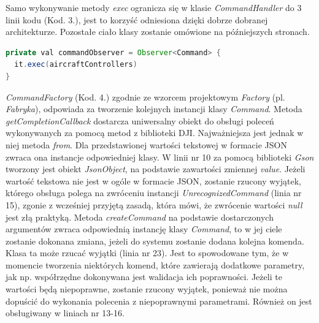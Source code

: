 Samo wykonywanie metody \textit{exec} ogranicza się w klasie \textit{CommandHandler} do 3 linii kodu (Kod. 3.), jest to korzyść odniesiona dzięki dobrze dobranej architekturze. Pozostałe ciało klasy zostanie omówione na późniejszych stronach.

\newpage

\begin{lstlisting}[language=Java, caption=Fragment kodu z CommandHandler]
private val commandObserver = Observer<Command> {
  it.exec(aircraftControllers)
}
\end{lstlisting}

\textit{CommandFactory} (Kod. 4.) zgodnie ze wzorcem projektowym \textit{Factory} (pl. \textit{Fabryka}), odpowiada za tworzenie kolejnych instancji klasy \textit{Command}. Metoda \textit{getCompletionCallback} dostarcza uniwersalny obiekt do obsługi poleceń wykonywanych za pomocą metod z biblioteki DJI. Najważniejsza jest jednak w niej metoda \textit{from}. Dla przedstawionej wartości tekstowej w formacie JSON zwraca ona instancje odpowiedniej klasy. W linii nr 10 za pomocą biblioteki \textit{Gson} tworzony jest obiekt \textit{JsonObject}, na podstawie zawartości zmiennej \textit{value}. Jeżeli wartość tekstowa nie jest w ogóle w formacie JSON, zostanie rzucony wyjątek, którego obsługa polega na zwróceniu instancji \textit{UnrecognizedCommand} (linia nr 15), zgonie z wcześniej przyjętą zasadą, która mówi, że zwrócenie wartości \textit{null} jest złą praktyką. Metoda \textit{createCommand} na podstawie dostarczonych argumentów zwraca odpowiednią instancję klasy \textit{Command}, to w jej ciele zostanie dokonana zmiana, jeżeli do systemu zostanie dodana kolejna komenda. Klasa ta może rzucać wyjątki (linia nr 23). Jest to spowodowane tym, że w momencie tworzenia niektórych komend, które zawierają dodatkowe parametry, jak np. współrzędne dokonywana jest walidacja ich poprawności. Jeżeli te wartości będą niepoprawne, zostanie rzucony wyjątek, ponieważ nie można dopuścić do wykonania polecenia z niepoprawnymi parametrami. Również on jest obsługiwany w liniach nr 13-16.



